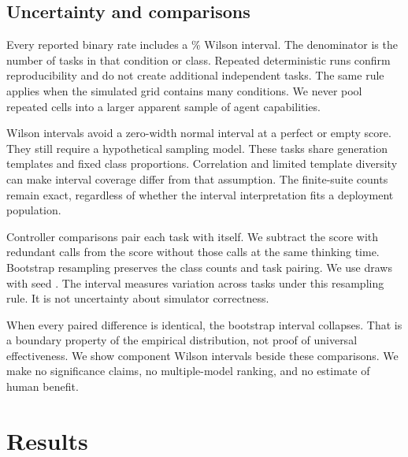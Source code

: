 \documentclass{article}
\begin{document}
\subsection{Uncertainty and comparisons}
Every reported binary rate includes a \CILevel{}\% Wilson interval. The denominator is the number of tasks in that condition or class. Repeated deterministic runs confirm reproducibility and do not create additional independent tasks. The same rule applies when the simulated grid contains many conditions. We never pool repeated cells into a larger apparent sample of agent capabilities.\par
Wilson intervals avoid a zero-width normal interval at a perfect or empty score. They still require a hypothetical sampling model. These tasks share generation templates and fixed class proportions. Correlation and limited template diversity can make interval coverage differ from that assumption. The finite-suite counts remain exact, regardless of whether the interval interpretation fits a deployment population.\par
Controller comparisons pair each task with itself. We subtract the score with redundant calls from the score without those calls at the same thinking time. Bootstrap resampling preserves the class counts and task pairing. We use \BootDraws{} draws with seed \SweepSeed{}. The interval measures variation across tasks under this resampling rule. It is not uncertainty about simulator correctness.\par
When every paired difference is identical, the bootstrap interval collapses. That is a boundary property of the empirical distribution, not proof of universal effectiveness. We show component Wilson intervals beside these comparisons. We make no significance claims, no multiple-model ranking, and no estimate of human benefit.\par
\section{Results}
\end{document}
